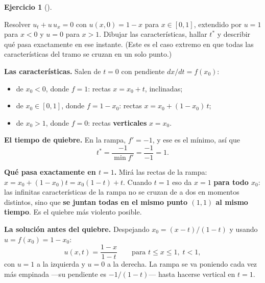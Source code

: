 \documentclass[
  spanish,
  a4paper,
]{scrbook}
\providecommand{\tightlist}{%
  \setlength{\itemsep}{0pt}\setlength{\parskip}{0pt}}
\theoremstyle{definition}
\theoremstyle{plain}
\theoremstyle{definition}
\theoremstyle{plain}
\theoremstyle{definition}
\newtheorem{exercise}{Ejercicio}[chapter]
\theoremstyle{remark}
\begin{document}
\begin{exercise}[]\protect\hypertarget{exr-burgers-explicito}{}\label{exr-burgers-explicito}

Resolver \(u_t + u\,u_x = 0\) con \(u(x,0) = 1 - x\) para \(x\in[0,1]\),
extendido por \(u=1\) para \(x<0\) y \(u=0\) para \(x>1\). Dibujar las
características, hallar \(t^*\) y describir qué pasa exactamente en ese
instante. (Este es el caso extremo en que todas las características del
tramo se cruzan en un solo punto.)

\end{exercise}

\begin{tcolorbox}[enhanced jigsaw, arc=.35mm, bottomrule=.15mm, bottomtitle=1mm, breakable, colback=white, colbacktitle=quarto-callout-tip-color!10!white, colframe=quarto-callout-tip-color-frame, coltitle=black, left=2mm, leftrule=.75mm, opacityback=0, opacitybacktitle=0.6, rightrule=.15mm, title=\textcolor{quarto-callout-tip-color}{\faLightbulb}\hspace{0.5em}{Solución}, titlerule=0mm, toprule=.15mm, toptitle=1mm]

\textbf{Las características.} Salen de \(t=0\) con pendiente
\(dx/dt = f(x_0)\):

\begin{itemize}
\tightlist
\item
  de \(x_0 < 0\), donde \(f=1\): rectas \(x = x_0 + t\), inclinadas;
\item
  de \(x_0 \in [0,1]\), donde \(f = 1-x_0\): rectas
  \(x = x_0 + (1-x_0)\,t\);
\item
  de \(x_0 > 1\), donde \(f = 0\): rectas \textbf{verticales}
  \(x = x_0\).
\end{itemize}

\textbf{El tiempo de quiebre.} En la rampa, \(f' = -1\), y ese es el
mínimo, así que \[t^{*} = \frac{-1}{\min f'} = \frac{-1}{-1} = 1 .\]

\textbf{Qué pasa exactamente en \(t=1\).} Mirá las rectas de la rampa:
\(x = x_0 + (1-x_0)t = x_0(1-t) + t\). Cuando \(t=1\) eso da \(x = 1\)
\textbf{para todo \(x_0\)}: las infinitas características de la rampa no
se cruzan de a dos en momentos distintos, sino que \textbf{se juntan
todas en el mismo punto \((1,1)\) al mismo tiempo}. Es el quiebre más
violento posible.

\textbf{La solución antes del quiebre.} Despejando \(x_0 = (x-t)/(1-t)\)
y usando \(u = f(x_0) = 1-x_0\): \[
u(x,t) = \frac{1-x}{1-t} \qquad \text{para } t \le x \le 1, \; t<1,
\] con \(u=1\) a la izquierda y \(u=0\) a la derecha. La rampa se va
poniendo cada vez más empinada ---su pendiente es \(-1/(1-t)\)--- hasta
hacerse vertical en \(t=1\).


\end{tcolorbox}
\end{document}
